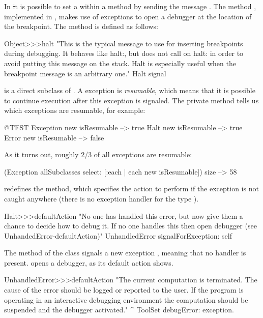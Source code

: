 \documentclass[a4paper,10pt,twoside]{book}
\begin{document}
In \st it is possible to set a  within a method by sending the message . The method , implemented in , makes use of exceptions to open a debugger at the location of the breakpoint.
The method  is defined as follows:

\begin{code}{}
Object>>>halt
	"This is the typical message to use for inserting breakpoints during 
	debugging. It behaves like halt:, but does not call on halt: in order to 
	avoid putting this message on the stack. Halt is especially useful when 
	the breakpoint message is an arbitrary one."
	Halt signal
\end{code}

 is a direct subclass of . A  exception is \emph{resumable}, which means that it is possible to continue execution after this exception is signaled. The private  method  tells us which exceptions are resumable, for example:
\begin{code}{@TEST}
Exception new isResumable --> true
Halt new isResumable          --> true
Error new isResumable         --> false
\end{code}

As it turns out, roughly 2/3 of all exceptions are resumable:
\begin{code}{}
(Exception allSubclasses select: [:each | each new isResumable]) size --> 58
\end{code}

 redefines the  method, which specifies the action to perform if the exception is not caught anywhere (\ie there is no exception handler for the type ).

\begin{code}{}
Halt>>>defaultAction
	"No one has handled this error, but now give them a chance to decide
	how to debug it.  If no one handles this then open debugger
	(see UnhandedError-defaultAction)"
	UnhandledError signalForException: self
\end{code}

The method   of the  class signals a new exception , meaning that no handler is present.  opens a debugger, as its default action shows.

\begin{code}{}
UnhandledError>>>defaultAction
	"The current computation is terminated. The cause of the error should be logged or reported to the user. If the program is operating in an interactive debugging environment the computation should be suspended and the debugger activated."
	^ ToolSet debugError: exception.
\end{code}
\end{document}
